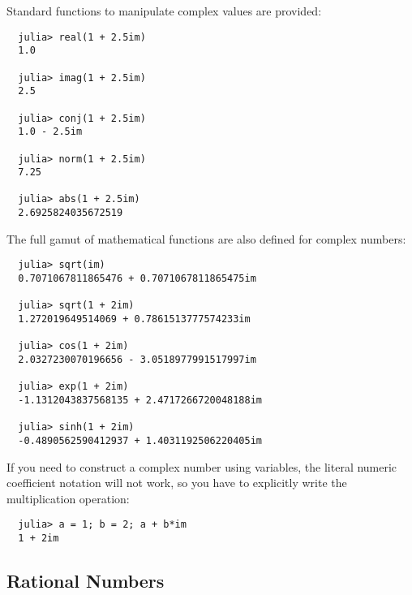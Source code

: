 \documentclass{article}
\begin{document}
Standard functions to manipulate complex values are provided:
\begin{verbatim}
  julia> real(1 + 2.5im)
  1.0

  julia> imag(1 + 2.5im)
  2.5

  julia> conj(1 + 2.5im)
  1.0 - 2.5im

  julia> norm(1 + 2.5im)
  7.25

  julia> abs(1 + 2.5im)
  2.6925824035672519
\end{verbatim}
The full gamut of mathematical functions are also defined for complex numbers:
\begin{verbatim}
  julia> sqrt(im)
  0.7071067811865476 + 0.7071067811865475im

  julia> sqrt(1 + 2im)
  1.272019649514069 + 0.7861513777574233im

  julia> cos(1 + 2im)
  2.0327230070196656 - 3.0518977991517997im

  julia> exp(1 + 2im)
  -1.1312043837568135 + 2.4717266720048188im

  julia> sinh(1 + 2im)
  -0.4890562590412937 + 1.4031192506220405im
\end{verbatim}

If you need to construct a complex number using variables, the literal numeric coefficient notation will not work, so you have to explicitly write the multiplication operation:
\begin{verbatim}
  julia> a = 1; b = 2; a + b*im
  1 + 2im
\end{verbatim}

\subsection{Rational Numbers}
\end{document}
